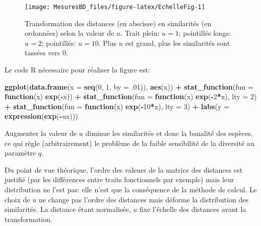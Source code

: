 \documentclass[
  11pt,
  french,
  a4paper,
  extrafontsizes,onecolumn,openright
  ]{memoir}
\newenvironment{Shaded}{\begin{snugshade}}{\end{snugshade}}
\newcommand{\AttributeTok}[1]{\textcolor[rgb]{0.13,0.29,0.53}{#1}}
\newcommand{\ControlFlowTok}[1]{\textcolor[rgb]{0.13,0.29,0.53}{\textbf{#1}}}
\newcommand{\DecValTok}[1]{\textcolor[rgb]{0.00,0.00,0.81}{#1}}
\newcommand{\FunctionTok}[1]{\textcolor[rgb]{0.13,0.29,0.53}{\textbf{#1}}}
\newcommand{\NormalTok}[1]{#1}
\newcommand{\SpecialCharTok}[1]{\textcolor[rgb]{0.81,0.36,0.00}{\textbf{#1}}}
\begin{document}
\scriptsize

\begin{figure}

{\centering \texttt{[image: MesuresBD\_files/figure-latex/EchelleFig-1]} 

}

\caption{Transformation des distances (en abscisse) en similarités (en ordonnées) selon la valeur de \(u\). Trait plein: \(u=1\); pointillés longs: \(u=2\); pointillés: \(u=10\). Plus \(u\) est grand, plus les similarités sont tassées vers 0.}\label{fig:EchelleFig}
\end{figure}

\normalsize

Le code R nécessaire pour réaliser la figure est:

\scriptsize

\begin{Shaded}
\begin{Highlighting}[]
\FunctionTok{ggplot}\NormalTok{(}\FunctionTok{data.frame}\NormalTok{(}\AttributeTok{x =} \FunctionTok{seq}\NormalTok{(}\DecValTok{0}\NormalTok{, }\DecValTok{1}\NormalTok{, }\AttributeTok{by =}\NormalTok{ .}\DecValTok{01}\NormalTok{)), }\FunctionTok{aes}\NormalTok{(x)) }\SpecialCharTok{+} 
  \FunctionTok{stat\_function}\NormalTok{(}\AttributeTok{fun =} \ControlFlowTok{function}\NormalTok{(x) }\FunctionTok{exp}\NormalTok{(}\SpecialCharTok{{-}}\NormalTok{x)) }\SpecialCharTok{+}
  \FunctionTok{stat\_function}\NormalTok{(}\AttributeTok{fun =} \ControlFlowTok{function}\NormalTok{(x) }\FunctionTok{exp}\NormalTok{(}\SpecialCharTok{{-}}\DecValTok{2}\SpecialCharTok{*}\NormalTok{x), }\AttributeTok{lty =} \DecValTok{2}\NormalTok{) }\SpecialCharTok{+}
  \FunctionTok{stat\_function}\NormalTok{(}\AttributeTok{fun =} \ControlFlowTok{function}\NormalTok{(x) }\FunctionTok{exp}\NormalTok{(}\SpecialCharTok{{-}}\DecValTok{10}\SpecialCharTok{*}\NormalTok{x), }\AttributeTok{lty =} \DecValTok{3}\NormalTok{) }\SpecialCharTok{+}
  \FunctionTok{labs}\NormalTok{(}\AttributeTok{y =} \FunctionTok{expression}\NormalTok{(}\FunctionTok{exp}\NormalTok{(}\SpecialCharTok{{-}}\NormalTok{ux)))}
\end{Highlighting}
\end{Shaded}

\normalsize

Augmenter la valeur de \(u\) diminue les similarités et donc la banalité des espèces, ce qui règle (arbitrairement) le problème de la faible sensibilité de la diversité au paramètre \(q\).

Du point de vue théorique, l'ordre des valeurs de la matrice des distances est justifié (par les différences entre traits fonctionnels par exemple) mais leur distribution ne l'est pas: elle n'est que la conséquence de la méthode de calcul.
Le choix de \(u\) ne change pas l'ordre des distances mais déforme la distribution des similarités.
La distance étant normalisée, \(u\) fixe l'échelle des distances avant la transformation.
\end{document}
